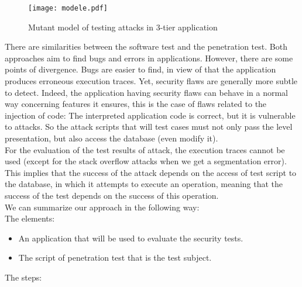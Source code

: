 \documentclass{acm_proc_article-sp}
\begin{document}
\begin{figure}[h!]                                                       \centering                                                               \texttt{[image: modele.pdf]}               \caption{Mutant model of testing attacks in 3-tier application}          \label{Mutant model of testing attacks in 3-tier application}            \end{figure}                                                             There are similarities between the software test and the penetration test. Both approaches aim to find bugs and errors in applications. However, there are some points of divergence. Bugs are easier to find, in view of that the application produces erroneous execution traces. Yet, security flaws are generally more subtle to detect. Indeed, the application having security flaws can behave in a normal way concerning features it ensures, this is the case of flaws related to the injection of code: The interpreted application code is correct, but it is vulnerable to attacks. So the attack scripts that will test cases must not only pass the level presentation, but also access the database (even modify it).\\
For the evaluation of the test results of attack, the execution traces cannot be used (except for the stack overflow attacks when we get a segmentation error). This implies that the success of the attack depends on the access of test script to the database, in which it attempts to execute an operation, meaning that the success of the test depends on the success of this operation.\\
We can summarize our approach in the following way:\\
The elements:
\begin{itemize}
\item An application that will be used to evaluate the security tests.
\item The script of penetration test that is the test subject.
\end{itemize}
The steps:
\end{document}
